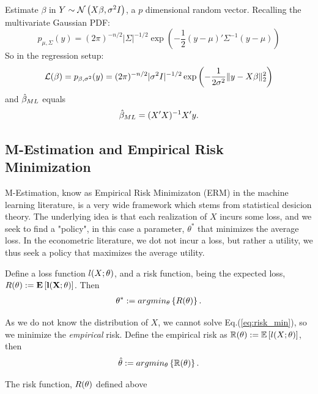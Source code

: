 \begin{example}

Estimate $\beta$ in $Y \sim \mathcal{N}\left(X\beta,\sigma^2 I\right)$, a $p$ dimensional random vector.
Recalling the multivariate Gaussian PDF:
$$
  p_{\mu,\Sigma}(y) = 
  (2 \pi)^{-n/2} |\Sigma|^{-1/2} \exp\left(
    -\frac{1}{2} (y-\mu)' \Sigma^{-1} (y-\mu)
  \right)
$$
So in the regression setup:
$$
  \mathcal{L}(\beta)= 
  p_{\beta,\sigma^2}(y) = 
  (2 \pi)^{-n/2} |\sigma^2 I|^{-1/2} \exp\left(
    -\frac{1}{2 \sigma^2} \Vert y-X\beta \Vert_2^2
  \right)
$$
and $\hat{\mathbf{\beta}}_{ML}$ equals 
\begin{align}
	\hat{\mathbf{\beta}}_{ML}=(X'X)^{-1} X'y.
\end{align}


\end{example}


\subsection{M-Estimation and Empirical Risk Minimization}
\label{sec:m_estimation}

M-Estimation, know as Empirical Risk Minimizaton (ERM) in the machine learning literature, is a very wide framework which stems from statistical desicion theory.
The underlying idea is that each realization of $X$ incurs some loss, and we seek to find a "policy", in this case a parameter, $\theta^*$ that minimizes the average loss.
In the econometric literature, we dot not incur a loss, but rather a utility, we thus seek a policy that maximizes the average utility.

Define a loss function $l(X;\theta)$, and a risk function, being the expected loss, 
$R(\theta):=\mathbf{E}\left[ \mathbf{l(X;\theta)} \right]$. Then 
\begin{align}
\label{eq:risk_min}
 \theta^*:= argmin_{\theta}\left\{ R(\theta) \right\}.
\end{align}



As we do not know the distribution of $X$, we cannot solve Eq.(\ref{eq:risk_min}), so we minimize the \emph{empirical} risk. 
Define the empirical risk as $\mathbb{R}(\theta):=\mathbb{E}\left[l(X;\theta)\right]$, then 
\begin{align}
\label{eq:empirical_risk_min}
 \hat{\mathbf{\theta}}:= argmin_{\theta}\left\{ \mathbb{R}(\theta) \right\}.
\end{align}

\begin{remark}
The risk function, $R(\theta)$ defined above
\end{remark}



